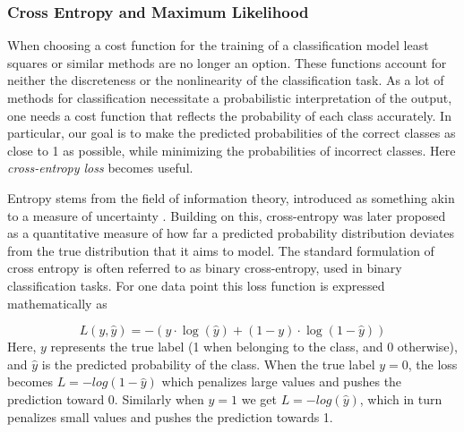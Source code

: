 
\subsubsection{Cross Entropy and Maximum Likelihood}\label{sec:cross-entropy}

When choosing a cost function for the training of a classification model least squares or similar methods are no longer an option. These functions account for neither the discreteness or the nonlinearity of the classification task. 
As a lot of methods for classification necessitate a probabilistic interpretation of the output, one needs a cost function that reflects the probability of each class accurately. In particular, our goal is to make the predicted probabilities of the correct classes as close to 1 as possible, while minimizing the probabilities of incorrect classes. Here \textit{cross-entropy loss} becomes useful.

Entropy stems from the field of information theory, introduced as something akin to a measure of uncertainty \cite{Shore}. Building on this, cross-entropy was later proposed as a quantitative measure of how far a predicted probability distribution deviates from the true distribution that it aims to model. The standard formulation of cross entropy is often referred to as binary cross-entropy, used in binary classification tasks. For one data point this loss function is expressed mathematically as \citep[p.31]{hastie}

\begin{equation}\label{cross-entropy loss}
    L(y, \hat{y}) = - \left( y \cdot \log(\hat{y}) + (1 - y) \cdot \log(1 - \hat{y}) \right)
\end{equation}
Here, 
$y$ represents the true label (1 when belonging to the class, and 0 otherwise), and $\hat{y}$ is the predicted probability of the class. When the true label $y=0$, the loss becomes $L=-log(1-\hat{y})$ which penalizes large values and pushes the prediction toward 0. Similarly when $y=1$ we get $L=-log(\hat{y})$, which in turn penalizes small values and pushes the prediction towards 1. 

